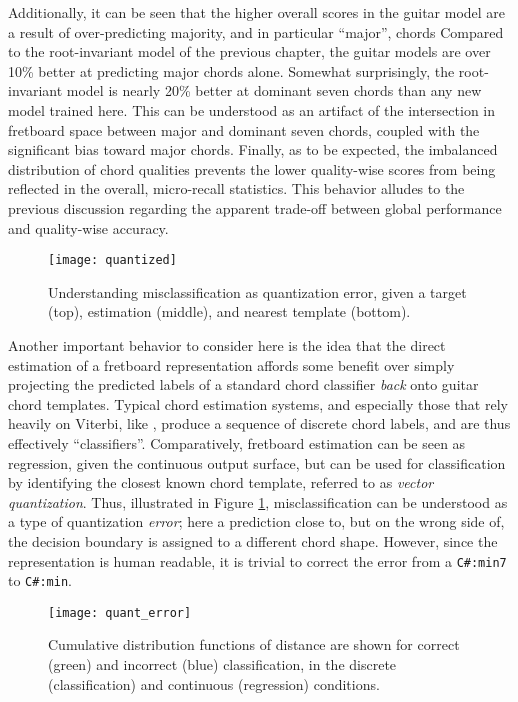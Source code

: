 Additionally, it can be seen that the higher overall scores in the guitar model are a result of over-predicting majority, and in particular ``major'', chords
Compared to the root-invariant model of the previous chapter, the guitar models are over 10\% better at predicting major chords alone.
Somewhat surprisingly, the root-invariant model is nearly 20\% better at dominant seven chords than any new model trained here.
This can be understood as an artifact of the intersection in fretboard space between major and dominant seven chords, coupled with the significant bias toward major chords.
Finally, as to be expected, the imbalanced distribution of chord qualities prevents the lower quality-wise scores from being reflected in the overall, micro-recall statistics.
This behavior alludes to the previous discussion regarding the apparent trade-off between global performance and quality-wise accuracy.


\begin{figure}[t!]
  \centering
  \centerline{\texttt{[image: quantized]}}
\caption{Understanding misclassification as quantization error, given a target (top), estimation (middle), and nearest template (bottom).}
\label{fig:quantized}
%
\end{figure}


Another important behavior to consider here is the idea that the direct estimation of a fretboard representation affords some benefit over simply projecting the predicted labels of a standard chord classifier \emph{back} onto guitar chord templates.
Typical chord estimation systems, and especially those that rely heavily on Viterbi, like \cite{Cho2014}, produce a sequence of discrete chord labels, and are thus effectively ``classifiers''.
Comparatively, fretboard estimation can be seen as regression, given the continuous output surface, but can be used for classification by identifying the closest known chord template, referred to as \emph{vector quantization}.
Thus, illustrated in Figure \ref{fig:quantized}, misclassification can be understood as a type of quantization \emph{error};
here a prediction close to, but on the wrong side of, the decision boundary is assigned to a different chord shape.
However, since the representation is human readable, it is trivial to correct the error from a \texttt{C\#:min7} to \texttt{C\#:min}.


\begin{figure}[t!]
  \centering
  \centerline{\texttt{[image: quant\_error]}}
\caption{Cumulative distribution functions of distance are shown for correct (green) and incorrect (blue) classification, in the discrete (classification) and continuous (regression) conditions.}
\label{fig:quant_error}
%
\end{figure}

